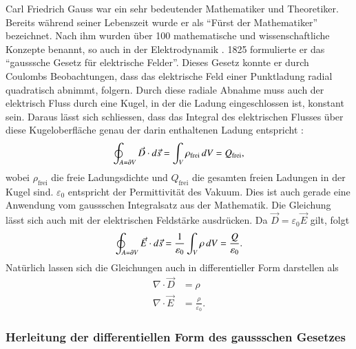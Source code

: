 Carl Friedrich Gauss war ein sehr bedeutender Mathematiker und Theoretiker.
%
Bereits während seiner Lebenszeit wurde er als ``Fürst der Mathematiker'' bezeichnet.
%
Nach ihm wurden über 100 mathematische und wissenschaftliche Konzepte benannt, so auch in der Elektrodynamik \cite{maxwell:Carl_Friedrich_Gauß}.
1825 formulierte er das ``gausssche Gesetz für elektrische Felder''.
Dieses Gesetz konnte er durch Coulombs Beobachtungen, dass das elektrische Feld einer Punktladung radial quadratisch abnimmt, folgern.
Durch diese radiale Abnahme muss auch der elektrisch Fluss durch eine Kugel, in der die Ladung eingeschlossen ist, konstant sein.
Daraus lässt sich schliessen, dass das Integral des elektrischen Flusses über diese Kugeloberfläche genau der darin enthaltenen Ladung entspricht \cite{maxwell:Gaußscher_Integralsatz}:
\begin{equation}
\label{maxwell:equasion:elektrisch}
\oint_{A=\d V} \vec{D} \cdot d\vec{s}
=
\int_{V} \rho_{\text{frei}}\, dV
=
Q_{\text{frei}} ,
\end{equation}
wobei $\rho_{\text{frei}}$ die freie Ladungsdichte und $Q_{\text{frei}}$ die gesamten freien Ladungen in der Kugel sind. $\varepsilon_0$ entspricht der Permittivität des Vakuum. Dies ist auch gerade eine Anwendung vom gaussschen Integralsatz aus der Mathematik.
Die Gleichung lässt sich auch mit der elektrischen Feldstärke ausdrücken. Da $\vec{D} = \varepsilon_0 \vec{E}$ gilt, folgt
\[
\oint_{A=\d V} \vec{E} \cdot d\vec{s}
=
\frac{1}{\varepsilon_0}\int_{V} \rho\, dV
=
\frac{Q}{\varepsilon_0} .
\]
Natürlich lassen sich die Gleichungen auch in differentieller Form darstellen als
\begin{align*}
	\nabla \cdot \vec{D}
	&=
	\rho
	\\
	\nabla \cdot \vec{E}
	&=
	\frac{\rho}{\varepsilon_0} .
\end{align*}

\subsubsection{Herleitung der differentiellen Form des gaussschen Gesetzes}

